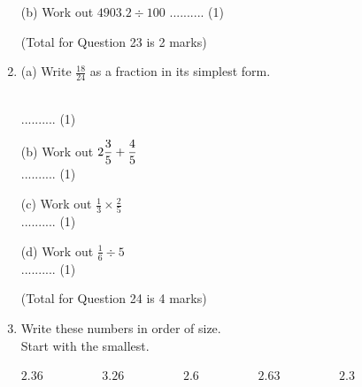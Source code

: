 \documentclass{article}
\begin{document}
\begin{enumerate}
\quad (b) Work out \hspace{3cm} \( \displaystyle 4903.2 \div 100 \) 
\vspace{120pt}
\hspace{15cm} .......... (1) 

\hfill\raggedright (Total for Question 23 is 2 marks) 
\vspace{5pt}
\hline
\vspace{7pt}

\item \quad (a) Write \( \displaystyle \frac{18}{24} \) as a fraction in its simplest form.

\vspace{140pt} \\ 
\hspace{15cm} .......... (1) 

\quad (b) Work out \hspace{3cm} \( \displaystyle \Large 2 \frac{3}{5} + \frac{4}{5} \)
\vspace{140pt} \\
\hspace{15cm} .......... (1) 

\quad (c) Work out \hspace{3cm} \( \displaystyle \frac{1}{3} \times \frac{2}{5} \)
\vspace{110pt} \\
\hspace{15cm} .......... (1) 

\quad (d) Work out \hspace{3cm} \( \displaystyle \frac{1}{6} \div 5 \)
\vspace{110pt} \\
\hspace{15cm} .......... (1) 
\vspace{5pt}

 \hfill\raggedright (Total for Question 24 is 4 marks) 
\vspace{5pt}
\hline
\vspace{7pt}

\item \quad Write these numbers in order of size. \\ 
\quad Start with the smallest.

\begin{center} 

\hspace{2cm} \( \displaystyle 2.36 \hspace{2cm} 3.26 \hspace{2cm} 2.6 \hspace{2cm} 2.63 \hspace{2cm} 2.3 \)
\vspace{100pt}


\end{center}
\end{enumerate}
\end{document}
